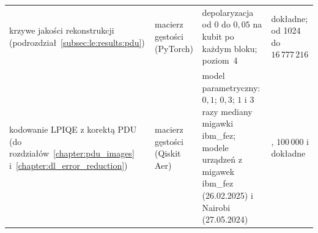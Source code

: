 \begin{table}[!tb]
\begin{tabular}{@{}>{\raggedright\arraybackslash}p{4.2cm}>{\raggedright\arraybackslash}p{3.0cm}>{\raggedright\arraybackslash}p{4.9cm}>{\raggedright\arraybackslash}p{2.7cm}@{}}
krzywe jakości rekonstrukcji (podrozdział~\ref{subsec:le:results:pdu}) & macierz gęstości (PyTorch) & depolaryzacja od $0$ do $0{,}05$ na kubit po każdym bloku; poziom~4 & dokładne; od 1024 do $16\,777\,216$ \\
kodowanie LPIQE z korektą PDU (do rozdziałów~\ref{chapter:pdu_images} i~\ref{chapter:dl_error_reduction}) & macierz gęstości (Qiskit Aer) & model parametryczny: $0{,}1$; $0{,}3$; $1$ i $3$ razy mediany migawki ibm\_fez; modele urządzeń z migawek ibm\_fez (26.02.2025) i Nairobi (27.05.2024) & 8192, $100\,000$ i dokładne \\
\bottomrule
\end{tabular}
\end{table}

